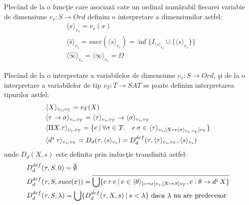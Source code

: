 Plec\^ and de la o func\c tie care asociaz\u a cate un ordinal num\u arabil fiecarei variabie de dimensiune $v_s : S \to Ord$ definim o interpretare a dimensiunilor astfel:
\begin{align*}
&\langle x \rangle_{v_s} = v_s(x) \\
&\langle \hat{s} \rangle_{v_s} =  succ(\langle s \rangle_{v_s} ) = \inf \{ I_{\langle s \rangle_{v_s} } \cup \{\langle s\rangle_{v_s} \} \} \\
&\langle \hat{\infty} \rangle_{v_s} = \langle \infty \rangle_{v_s} = \Omega
\end{align*}

Plec\^ and de la o interpretare a variabilelor de dimensiune $v_s : S \to Ord$, \c si de la o interpretare a variabilelor de tip $v_T : T \to SAT$ se poate definim interpretarea tipurilor astfel:
\begin{align*}
&\langle X \rangle_{v_s,v_T} = v_T(X) \\
&\langle \tau \to \sigma \rangle_{v_s,v_T} =  \langle \tau \rangle_{v_s,v_T} \to \langle \sigma \rangle_{v_s,v_T} \\
&\langle \Pi X. \tau \rangle_{v_s,v_T} = \{ e \: |\: \forall \sigma \in T .\quad e\hspace{2pt} \sigma \in \langle \tau \rangle_{v_s,[X\mapsto \langle \sigma \rangle_{v_s,v_T} ]v_T}\} \\
&\langle d^{s}\hspace{2pt}\tau \rangle_{v_s,v_T} = D_d( \tau , \langle s \rangle_{v_s}) = D_d^{def} ( \tau, \langle \tau \rangle_{v_s,v_T}, \langle s \rangle_{v_s})
\end{align*}
unde $D_d(X,s)$ este definita prin induc\c tie transfinit\u a astfel:
\begin{align*}
& D_d^{def}( \tau, S , 0) = \overline{\emptyset} \\
& D_d^{def}( \tau, S, succ(x)) = \overline{\bigcup \{c \hspace{2pt} \tau\hspace{2pt} e \: | \: e \in \langle \theta \rangle_{[ \iota \mapsto x]v_s,[X \mapsto S] v_T}, c : \theta\to d^{\hat{\iota}} \hspace{2pt} X \}} \\
& D_d^{def}( \tau, S, \lambda) = \bigcup\{D_d^{def}(\tau, X,s) \: | \: s < \lambda \} \text{ daca $\lambda$ nu are predecesor }
\end{align*}

